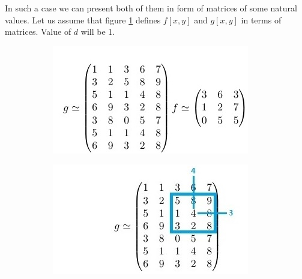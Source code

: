 \documentclass{article}
\begin{document}
\begin{description}
In such a case we can present both of them in form of matrices of some natural values. Let us assume that figure \ref{fig:example_repr} defines $f[x,y]$ and $g[x,y]$ in terms of matrices. Value of $d$ will be 1.
\begin{figure}[H]
\centering
\begin{subfigure}{.4\textwidth}
  \centering
  \includegraphics[width=0.95\linewidth]{_Figures/example_11.jpg}
  \caption{}
  \label{fig:example_repr}
\end{subfigure}%
\begin{subfigure}{.4\textwidth}
  \centering
  \includegraphics[width=0.95\linewidth]{_Figures/example_12.jpg}
  \caption{}
  \label{fig:example_43}
\end{subfigure}%
\caption{}
\label{fig:results_tresh}
\end{figure}


\end{description}
\end{document}

